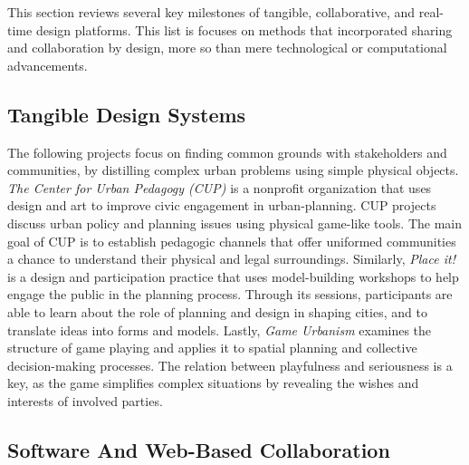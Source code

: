 {
    This section reviews several key milestones of tangible, collaborative, and real-time design platforms. This list is focuses on methods that incorporated sharing and collaboration by design, more so than mere technological or computational advancements.

    \subsection{Tangible Design Systems}
    {
        The following projects focus on finding common grounds with stakeholders and communities, by distilling complex urban problems using simple physical objects. \textit{The Center for Urban Pedagogy (CUP)} \cite{menking2009center} is a nonprofit organization that uses design and art to improve civic engagement in urban-planning. CUP projects discuss urban policy and planning issues using physical game-like tools. The main goal of CUP is to establish pedagogic channels that offer uniformed communities a chance to understand their physical and legal surroundings. Similarly, \textit{Place it!} \cite{HumanCit17:online} is a design and participation practice that uses model-building workshops to help engage the public in the planning process. Through its sessions, participants are able to learn about the role of planning and design in shaping cities, and to translate ideas into forms and models. Lastly, \textit{Game Urbanism} \cite{venhuizen2010game} examines the structure of game playing and applies it to spatial planning and collective decision-making processes. The relation between playfulness and seriousness is a key, as the game simplifies complex situations by revealing the wishes and interests of involved parties.
    }
    \subsection{Software And Web-Based Collaboration}
    {

}}
